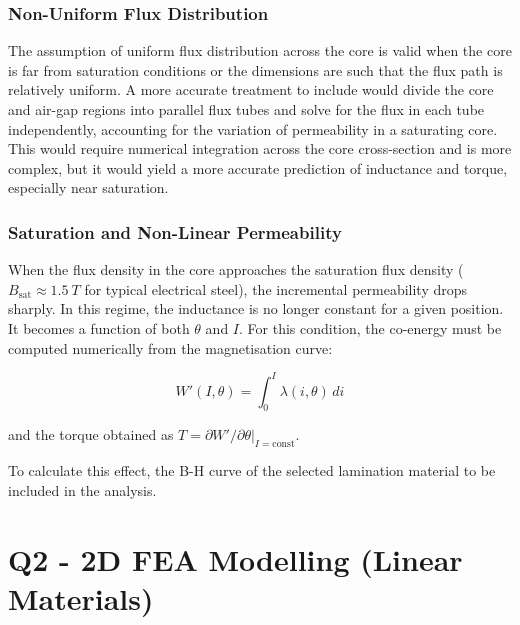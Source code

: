 \documentclass[12pt, a4paper]{article}
\begin{document}
\subsubsection{Non-Uniform Flux Distribution}

The assumption of uniform flux distribution across the core is valid when the core is far from saturation conditions or the dimensions are such that the flux path is relatively uniform. A more accurate treatment to include would divide the core and air-gap regions into parallel flux tubes and solve for the flux in each tube independently, accounting for the variation of permeability in a saturating core. This would require numerical integration across the core cross-section and is more complex, but it would yield a more accurate prediction of inductance and torque, especially near saturation.

\subsubsection{Saturation and Non-Linear Permeability}

When the flux density in the core approaches the saturation flux density ($B_\text{sat} \approx \SI{1.5}{T}$ for typical electrical steel), the incremental permeability drops sharply. In this regime, the inductance is no longer constant for a given position. It becomes a function of both $\theta$ and $I$. For this condition, the co-energy must be computed numerically from the magnetisation curve:

\begin{equation}
    W'(I,\theta) = \int_0^I \lambda(i, \theta)\, di
\end{equation}

and the torque obtained as $T = \partial W' / \partial \theta \big|_{I=\text{const}}$.

To calculate this effect, the B-H curve of the selected lamination material to be included in the analysis.










\section{Q2 - 2D FEA Modelling (Linear Materials)}
\end{document}
